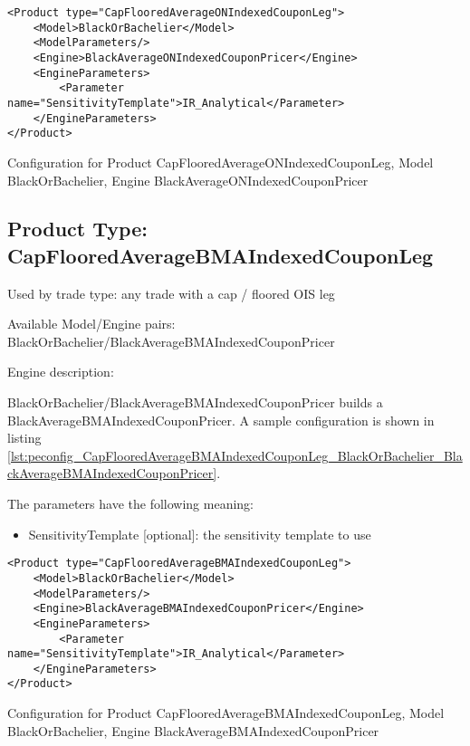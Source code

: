 \begin{longlisting}
\begin{verbatim}
<Product type="CapFlooredAverageONIndexedCouponLeg">
    <Model>BlackOrBachelier</Model>
    <ModelParameters/>
    <Engine>BlackAverageONIndexedCouponPricer</Engine>
    <EngineParameters>
        <Parameter name="SensitivityTemplate">IR_Analytical</Parameter>
    </EngineParameters>
</Product>
\end{verbatim}
\caption{Configuration for Product CapFlooredAverageONIndexedCouponLeg, Model BlackOrBachelier, Engine BlackAverageONIndexedCouponPricer}
\label{lst:peconfig_CapFlooredAverageONIndexedCouponLeg_BlackOrBachelier_BlackAverageONIndexedCouponPricer}
\end{longlisting}

\subsection{Product Type: CapFlooredAverageBMAIndexedCouponLeg}

Used by trade type: any trade with a cap / floored OIS leg

Available Model/Engine pairs: BlackOrBachelier/BlackAverageBMAIndexedCouponPricer

Engine description:

BlackOrBachelier/BlackAverageBMAIndexedCouponPricer builds a BlackAverageBMAIndexedCouponPricer. A sample configuration is
shown in listing \ref{lst:peconfig_CapFlooredAverageBMAIndexedCouponLeg_BlackOrBachelier_BlackAverageBMAIndexedCouponPricer}.

The parameters have the following meaning:

\begin{itemize}
\item SensitivityTemplate [optional]: the sensitivity template to use 
\end{itemize}

\begin{longlisting}
\begin{verbatim}
<Product type="CapFlooredAverageBMAIndexedCouponLeg">
    <Model>BlackOrBachelier</Model>
    <ModelParameters/>
    <Engine>BlackAverageBMAIndexedCouponPricer</Engine>
    <EngineParameters>
        <Parameter name="SensitivityTemplate">IR_Analytical</Parameter>
    </EngineParameters>
</Product>
\end{verbatim}
\caption{Configuration for Product CapFlooredAverageBMAIndexedCouponLeg, Model BlackOrBachelier, Engine BlackAverageBMAIndexedCouponPricer}
\label{lst:peconfig_CapFlooredAverageBMAIndexedCouponLeg_BlackOrBachelier_BlackAverageBMAIndexedCouponPricer}
\end{longlisting}

